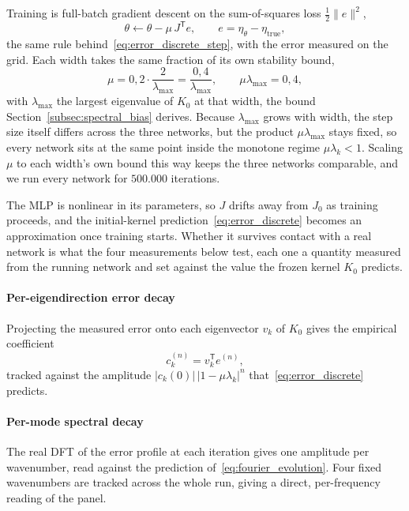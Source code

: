 Training is full-batch gradient descent on the sum-of-squares loss $\tfrac{1}{2}\|e\|^2$,
\begin{equation*}
    \theta \leftarrow \theta - \mu\, J^{\mathsf{T}} e, \qquad e = \eta_\theta - \eta_{\text{true}},
\end{equation*}
the same rule behind~\eqref{eq:error_discrete_step}, with the error measured on the grid. Each width takes the same fraction of its own stability bound,
\begin{equation}\label{eq:m_minimal_step}
    \mu = 0{,}2 \cdot \frac{2}{\lambda_{\max}} = \frac{0{,}4}{\lambda_{\max}}, \qquad \mu\lambda_{\max} = 0{,}4,
\end{equation}
with $\lambda_{\max}$ the largest eigenvalue of $K_0$ at that width, the bound Section~\ref{subsec:spectral_bias} derives. Because $\lambda_{\max}$ grows with width, the step size itself differs across the three networks, but the product $\mu\lambda_{\max}$ stays fixed, so every network sits at the same point inside the monotone regime $\mu\lambda_k < 1$. Scaling $\mu$ to each width's own bound this way keeps the three networks comparable, and we run every network for $500.000$ iterations.

The MLP is nonlinear in its parameters, so $J$ drifts away from $J_0$ as training proceeds, and the initial-kernel prediction~\eqref{eq:error_discrete} becomes an approximation once training starts. Whether it survives contact with a real network is what the four measurements below test, each one a quantity measured from the running network and set against the value the frozen kernel $K_0$ predicts.

\paragraph{Per-eigendirection error decay} Projecting the measured error onto each eigenvector $v_k$ of $K_0$ gives the empirical coefficient
\begin{equation}\label{eq:m_minimal_ck}
    c_k^{(n)} = v_k^{\mathsf{T}} e^{(n)},
\end{equation}
tracked against the amplitude $|c_k(0)|\,|1-\mu\lambda_k|^n$ that~\eqref{eq:error_discrete} predicts.

\paragraph{Per-mode spectral decay} The real DFT of the error profile at each iteration gives one amplitude per wavenumber, read against the prediction of~\eqref{eq:fourier_evolution}. Four fixed wavenumbers are tracked across the whole run, giving a direct, per-frequency reading of the panel.

